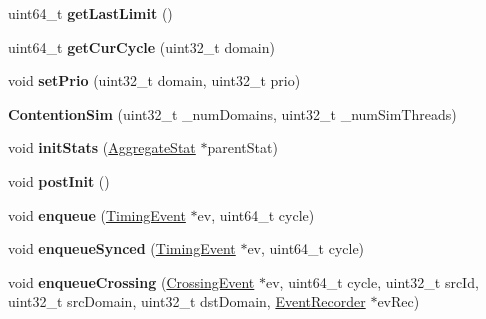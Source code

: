 \begin{DoxyCompactItemize}
\item 
\hypertarget{classContentionSim_ae9982a572df654edb1bf6a7f5f0d2197}{uint64\-\_\-t {\bfseries get\-Last\-Limit} ()}\label{classContentionSim_ae9982a572df654edb1bf6a7f5f0d2197}

\item 
\hypertarget{classContentionSim_a782a5b4f4f1d980cd781ef9b87c2c7c3}{uint64\-\_\-t {\bfseries get\-Cur\-Cycle} (uint32\-\_\-t domain)}\label{classContentionSim_a782a5b4f4f1d980cd781ef9b87c2c7c3}

\item 
\hypertarget{classContentionSim_aff58f59d88d745695f24441f08fc0eb8}{void {\bfseries set\-Prio} (uint32\-\_\-t domain, uint32\-\_\-t prio)}\label{classContentionSim_aff58f59d88d745695f24441f08fc0eb8}

\item 
\hypertarget{classContentionSim_a4c7d65f216bc7cd5b4db0f4736d269d3}{{\bfseries Contention\-Sim} (uint32\-\_\-t \-\_\-num\-Domains, uint32\-\_\-t \-\_\-num\-Sim\-Threads)}\label{classContentionSim_a4c7d65f216bc7cd5b4db0f4736d269d3}

\item 
\hypertarget{classContentionSim_a43f3141595b3d9ea5e067ce8ce74d79c}{void {\bfseries init\-Stats} (\hyperlink{classAggregateStat}{Aggregate\-Stat} $\ast$parent\-Stat)}\label{classContentionSim_a43f3141595b3d9ea5e067ce8ce74d79c}

\item 
\hypertarget{classContentionSim_a5fc392e200bc8c0acada32e838420ecc}{void {\bfseries post\-Init} ()}\label{classContentionSim_a5fc392e200bc8c0acada32e838420ecc}

\item 
\hypertarget{classContentionSim_a1cd640e573094fb670fc8b83f4a07332}{void {\bfseries enqueue} (\hyperlink{classTimingEvent}{Timing\-Event} $\ast$ev, uint64\-\_\-t cycle)}\label{classContentionSim_a1cd640e573094fb670fc8b83f4a07332}

\item 
\hypertarget{classContentionSim_aade85cbc1438a43581a34036fc79bb12}{void {\bfseries enqueue\-Synced} (\hyperlink{classTimingEvent}{Timing\-Event} $\ast$ev, uint64\-\_\-t cycle)}\label{classContentionSim_aade85cbc1438a43581a34036fc79bb12}

\item 
\hypertarget{classContentionSim_a4c06e1040f29e473b080f80fb80b8230}{void {\bfseries enqueue\-Crossing} (\hyperlink{classCrossingEvent}{Crossing\-Event} $\ast$ev, uint64\-\_\-t cycle, uint32\-\_\-t src\-Id, uint32\-\_\-t src\-Domain, uint32\-\_\-t dst\-Domain, \hyperlink{classEventRecorder}{Event\-Recorder} $\ast$ev\-Rec)}\label{classContentionSim_a4c06e1040f29e473b080f80fb80b8230}


\end{DoxyCompactItemize}
